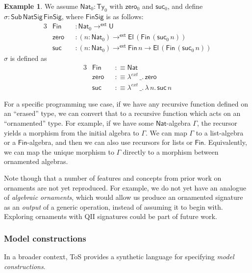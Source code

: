 \documentclass[12pt,a4paper,twoside,openany]{book}
\theoremstyle{remark}
\theoremstyle{definition}
\newtheorem{myexample}{Example}
\theoremstyle{theorem}
\newcommand{\ms}[1]{\mathsf{#1}}
\newcommand{\zero}{\ms{zero}}
\newcommand{\suc}{\ms{suc}}
\newcommand{\Sub}{\mathsf{Sub}}
\newcommand{\Ty}{\mathsf{Ty}}
\newcommand{\U}{\mathsf{U}}
\newcommand{\El}{\mathsf{El}}
\newcommand{\toe}{\to^{\ms{ext}}}
\newcommand{\Nat}{\ms{Nat}}
\newcommand{\defn}{:\equiv}
\begin{document}
\begin{myexample}
  We assume $\Nat_0 : \Ty_0$ with $\zero_0$ and $\suc_0$, and define $\sigma : \Sub\,\ms{NatSig}\,\ms{FinSig}$, where $\ms{FinSig}$ is as follows:
\begin{alignat*}{3}
  &\ms{Fin}  &&: \Nat_0 \toe \U\\
  &\ms{zero} &&: (n : \Nat_0) \toe \El\,(\ms{Fin}\,(\suc_0\,n))\\
  &\ms{suc}  &&: (n : \Nat_0) \toe \ms{Fin}\,n \to \El\,(\ms{Fin}\,(\suc_0\,n))
\end{alignat*}
$\sigma$ is defined as
\begin{alignat*}{3}
  &\ms{Fin}  &&\defn \ms{Nat}\\
  &\ms{zero} &&\defn \lambda^{ext}\,\_.\,\ms{zero}\\
  &\ms{suc}  &&\defn \lambda^{ext}\,\_.\,\lambda\,n.\,\ms{suc}\,n
\end{alignat*}
\end{myexample}
For a specific programming use case, if we have any recursive function defined
on an ``erased'' type, we can convert that to a recursive function which acts on
an ``ornamented'' type. For example, if we have some $\Nat$-algebra $\Gamma$,
the recursor yields a morphism from the initial algebra to $\Gamma$. We can map
$\Gamma$ to a list-algebra or a $\ms{Fin}$-algebra, and then we can also use
recursors for lists or $\ms{Fin}$. Equivalently, we can map the unique morphism
to $\Gamma$ directly to a morphism between ornamented algebras.

Note though that a number of features and concepts from prior work on ornaments
are not yet reproduced. For example, we do not yet have an analogue of
\emph{algebraic ornaments}, which would allow us produce an ornamented signature
as an \emph{output} of a generic operation, instead of assuming it to begin
with. Exploring ornaments with QII signatures could be part of future work.

\subsubsection{Model constructions}

In a broader context, ToS provides a synthetic language for specifying
\emph{model constructions}.
\end{document}
